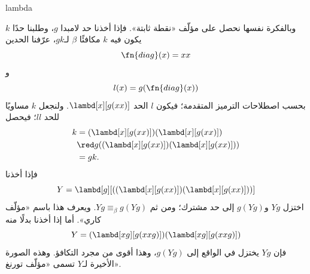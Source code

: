\documentclass[../../../include/open-logic-section]{subfiles}
\begin{document}
\begin{tagblock}{lambda}
\begin{digress}
وبالفكرة نفسها نحصل على مؤلّف «نقطة ثابتة». فإذا
أخذنا حد لامبدا $g$، وطلبنا حدًا $k$ يكون فيه $k$ مكافئًا
$\beta$ لـ$gk$، عرّفنا الحدين
\[
\fn{diag}(x) = xx
\]
و
\[
l(x) = g(\fn{diag}(x))
\]
بحسب اصطلاحات الترميز المتقدمة؛ فيكون $l$ الحد
$\lambd[x][g(xx)]$. ولنجعل $k$ مساويًا للحد $ll$؛ فيحصل
\begin{align*}
k & = (\lambd[x][g(xx)])(\lambd[x][g(xx)]) \\
& \red  g((\lambd[x][g(xx)])(\lambd[x][g(xx)])) \\
& = gk.
\end{align*}
فإذا أخذنا
\[
Y = \lambd[g][((\lambd[x][g(xx)])(\lambd[x][g(xx)]))]
\]
اختزل $Yg$ و$g(Yg)$ إلى حد مشترك؛ ومن ثم
$Yg \equiv_\beta g(Yg)$. ويعرف هذا باسم «مؤلّف كاري». أما إذا أخذنا
بدلًا منه
\[
Y = (\lambd[xg][g(xxg)])(\lambd[xg][g(xxg)])
\]
فإن $Yg$ يختزل في الواقع إلى $g(Yg)$، وهذا أقوى من مجرد التكافؤ. وهذه
الصورة الأخيرة لـ$Y$ تسمى «مؤلّف تورنغ».
\end{digress}
\end{tagblock}
\end{document}
